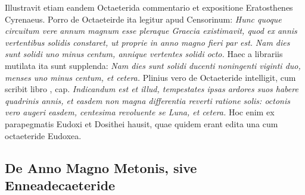 Illustravit etiam eandem Octaeterida commentario et expositione
Eratosthenes Cyrenaeus.
Porro de Octaeteirde ita legitur apud
Censorinum: \emph{Hunc quoque circuitum vere annum magnum esse pleraque
Graecia existimavit, quod ex annis vertentibus solidis constaret,
ut proprie in anno magno fieri par est.}
\emph{Nam dies sunt solidi uno minus
centum, annique vertentes solidi octo.}
Haec a librariis mutilata
ita sunt supplenda: \emph{Nam dies sunt solidi ducenti noningenti viginti
duo, menses uno minus centum, et cetera.}
Plinius vero de Octaeteride
intelligit, cum scribit libro
 ,  cap. \emph{Indicandum est et
illud, tempestates ipsas ardores suos habere quadrinis annis, et easdem
non magna differentia reverti ratione solis: octonis vero augeri easdem,
centesima revoluente se Luna, et cetera.}
Hoc enim ex parapegmatis Eudoxi
et Dosithei hausit, quae quidem erant edita una cum octaeteride
Eudoxea.

\subsection{De Anno Magno Metonis, sive Enneadecaeteride}

